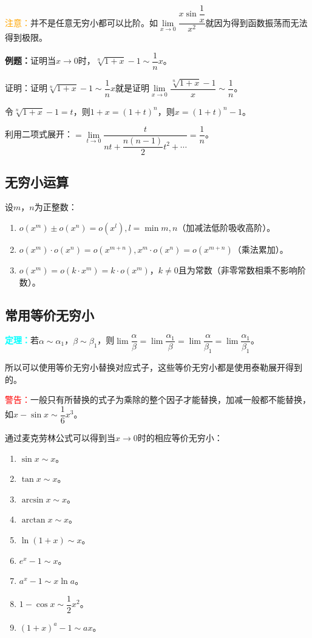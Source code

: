 \documentclass[UTF8, 12pt]{ctexart}
\begin{document}
\textcolor{orange}{注意：}并不是任意无穷小都可以比阶。如$\lim\limits_{x\to 0}\dfrac{x\sin\dfrac{1}{x}}{x^2}$就因为得到函数振荡而无法得到极限。

\textbf{例题：}证明当$x\to 0$时，$\sqrt[n]{1+x}-1\sim\dfrac{1}{n}x$。

证明：证明$\sqrt[n]{1+x}-1\sim\dfrac{1}{n}x$就是证明$\lim\limits_{x\to 0}\dfrac{\sqrt[n]{1+x}-1}{x}\sim\dfrac{1}{n}$。

令$\sqrt[n]{1+x}-1=t$，则$1+x=(1+t)^n$，则$x=(1+t)^n-1$。

利用二项式展开：$=\lim\limits_{t\to 0}\dfrac{t}{nt+\dfrac{n(n-1)}{2}t^2+\cdots}=\dfrac{1}{n}$。

\subsection{无穷小运算}

设$m$，$n$为正整数：

\begin{enumerate}
    \item $o(x^m)\pm o(x^n)=o(x^l),l=\min{m,n}$（加减法低阶吸收高阶）。
    \item $o(x^m)\cdot o(x^n)=o(x^{m+n}),x^m\cdot o(x^n)=o(x^{m+n})$（乘法累加）。
    \item $o(x^m)=o(k\cdot x^m)=k\cdot o(x^m)$，$k\neq 0$且为常数（非零常数相乘不影响阶数）。
\end{enumerate}

\subsection{常用等价无穷小}

\textcolor{aqua}{\textbf{定理：}}若$\alpha\sim\alpha_1$，$\beta\sim\beta_1$，则$\lim\dfrac{\alpha}{\beta}=\lim\dfrac{\alpha_1}{\beta}=\lim\dfrac{\alpha}{\beta_1}=\lim\dfrac{\alpha_1}{\beta_1}$。

所以可以使用等价无穷小替换对应式子，这些等价无穷小都是使用泰勒展开得到的。

\textcolor{red}{警告：}一般只有所替换的式子为乘除的整个因子才能替换，加减一般都不能替换，如$x-\sin x\sim\dfrac{1}{6}x^3$。

通过麦克劳林公式可以得到当$x\to 0$时的相应等价无穷小：

\begin{enumerate}
    \item $\sin x\sim x$。
    \item $\tan x\sim x$。
    \item $\arcsin x\sim x$。
    \item $\arctan x\sim x$。
    \item $\ln(1+x)\sim x$。
    \item $e^x-1\sim x$。
    \item $a^x-1\sim x\ln a$。
    \item $1-\cos x\sim\dfrac{1}{2}x^2$。
    \item $(1+x)^a-1\sim ax$。
\end{enumerate}
\end{document}

